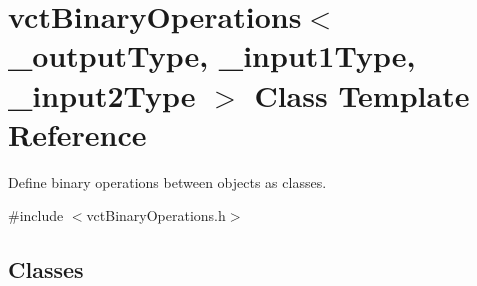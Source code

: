\hypertarget{classvct_binary_operations}{\section{vct\-Binary\-Operations$<$ \-\_\-output\-Type, \-\_\-input1\-Type, \-\_\-input2\-Type $>$ Class Template Reference}
\label{classvct_binary_operations}
}


Define binary operations between objects as classes.  




{\ttfamily \#include $<$vct\-Binary\-Operations.\-h$>$}

\subsection*{Classes}
